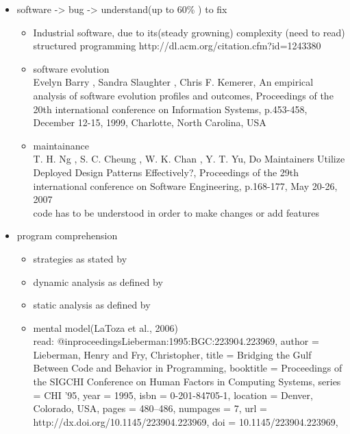 \begin{itemize}
\item software -> bug -> understand(up to 60\% \cite{Basili:1997:EPR:257260.257262} \cite{Pigoski:1996:PSM:524398} ) to fix
	\begin{itemize}
	\item Industrial software, due to its(steady growning) complexity \cite{Lehman:1985:PEP:7261}(need to read) \\ structured programming http://dl.acm.org/citation.cfm?id=1243380
	\item software evolution \\
		Evelyn Barry , Sandra Slaughter , Chris F. Kemerer, An empirical analysis of software evolution profiles and outcomes, Proceedings of the 20th international conference on Information Systems, p.453-458, December 12-15, 1999, Charlotte, North Carolina, USA
	\item maintainance \cite{Lientz:1980:SMM:601062} \cite{ISOSWMaintainance} \\
		T. H. Ng , S. C. Cheung , W. K. Chan , Y. T. Yu, Do Maintainers Utilize Deployed Design Patterns Effectively?, Proceedings of the 29th international conference on Software Engineering, p.168-177, May 20-26, 2007 \\
		code has to be understood \cite{Boehm:1976:SE:1311958.1312684} in order to make changes or add features \cite{Singer97anexamination}
	\end{itemize}
\item program comprehension
	\begin{itemize}
	\item strategies as stated by \cite{Storey:1999:CDE:308936.308940}
	\item dynamic analysis as defined by \cite{Ball:1999:CDA:318774.318944} \cite{Cornelissen:2009:SSP:1638616.1639301}
	\item static analysis as defined by \cite{Ball:1999:CDA:318774.318944}
	\item mental model(LaToza et al., 2006)\\ read: 
	@inproceedings{Lieberman:1995:BGC:223904.223969,
	 author = {Lieberman, Henry and Fry, Christopher},
	 title = {Bridging the Gulf Between Code and Behavior in Programming},
	 booktitle = {Proceedings of the SIGCHI Conference on Human Factors in Computing Systems},
	 series = {CHI '95},
	 year = {1995},
	 isbn = {0-201-84705-1},
	 location = {Denver, Colorado, USA},
	 pages = {480--486},
	 numpages = {7},
	 url = {http://dx.doi.org/10.1145/223904.223969},
	 doi = {10.1145/223904.223969},
}
\end{itemize}
\end{itemize}
